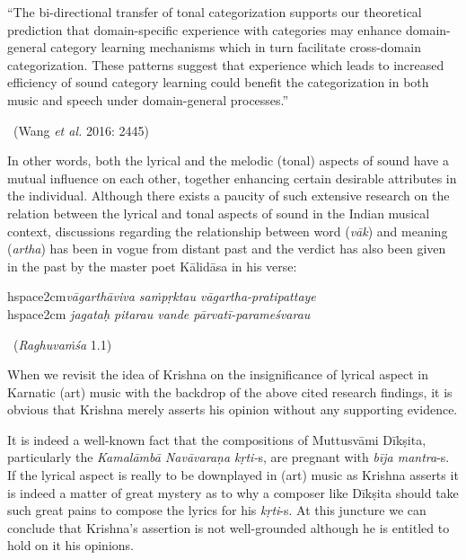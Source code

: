 \begin{myquote}
“The bi-directional transfer of tonal categorization supports our theoretical prediction that domain-specific experience with categories may enhance domain-general category learning mechanisms which in turn facilitate cross-domain categorization. These patterns suggest that experience which leads to increased efficiency of sound category learning could benefit the categorization in both music and speech under domain-general processes.”
\end{myquote}

\vspace{-.3cm}

\begin{myquote}

~\hfill (Wang \textit{et al.} 2016: 2445)
\end{myquote}

In other words, both the lyrical and the melodic (tonal) aspects of sound have a mutual influence on each other, together enhancing certain desirable attributes in the individual. Although there exists a paucity of such extensive research on the relation between the lyrical and tonal aspects of sound in the Indian musical context, discussions regarding the relationship between word (\textit{vāk}) and meaning (\textit{artha}) has been in vogue from distant past and the verdict has also been given in the past by the master poet Kālidāsa in his verse:

\vspace{.1cm}

\begin{myquote}
hspace{2cm}\textit{vāgarthāviva saṁpṛktau vāgartha-pratipattaye  }\\hspace{2cm} \textit{jagataḥ pitarau vande pārvatī-parameśvarau } 

~\hfill (\textit{Raghuvaṁśa} 1.1)
\end{myquote}

\vspace{.1cm}

When we revisit the idea of Krishna on the insignificance of lyrical aspect in Karnatic (art) music with the backdrop of the above cited research findings, it is obvious that Krishna merely asserts his opinion without any supporting evidence.

It is indeed a well-known fact that the compositions of Muttusvāmi Dīkṣita, particularly the \textit{Kamalāmbā Navāvaraṇa kṛti-}s, are pregnant with \textit{bīja mantra}-s. If the lyrical aspect is really to be downplayed in (art) music as Krishna asserts it is indeed a matter of great mystery as to why a composer like Dīkṣita should take such great pains to compose the lyrics for his \textit{kṛti}-s. At this juncture we can conclude that Krishna’s assertion is not well-grounded although he is entitled to hold on it his opinions.

